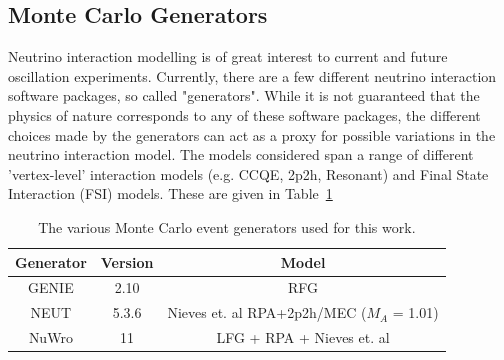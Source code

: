 \documentclass[12pt]{article}
\begin{document}
\subsection{Monte Carlo Generators}
\label{subsec:gen}
Neutrino interaction modelling is of great interest to current and future oscillation experiments. Currently, there are a few different neutrino interaction software packages, so called "generators". While it is not guaranteed that the physics of nature corresponds to any of these software packages, the different choices made by the generators can act as a proxy for possible variations in the neutrino interaction model. The models considered span a range of different 'vertex-level' interaction models (e.g. CCQE, 2p2h, Resonant) and Final State Interaction (FSI) models. These are given in Table~\ref{tab:gens}



\begin{table}
\centering
 \begin{tabular}{| c | c | c |} 
 \hline
 Generator & Version & Model\\ [0.5ex] 
 \hline
 GENIE & 2.10 & RFG \\ 
 \hline
 NEUT & 5.3.6 & Nieves et. al RPA+2p2h/MEC ($M_A$ = 1.01) \\
 \hline
 NuWro & 11 & LFG + RPA + Nieves et. al \\[1ex]
 \hline
\end{tabular}
\caption{The various Monte Carlo event generators used for this work.}
\label{tab:gens}
\end{table}

\end{document}

